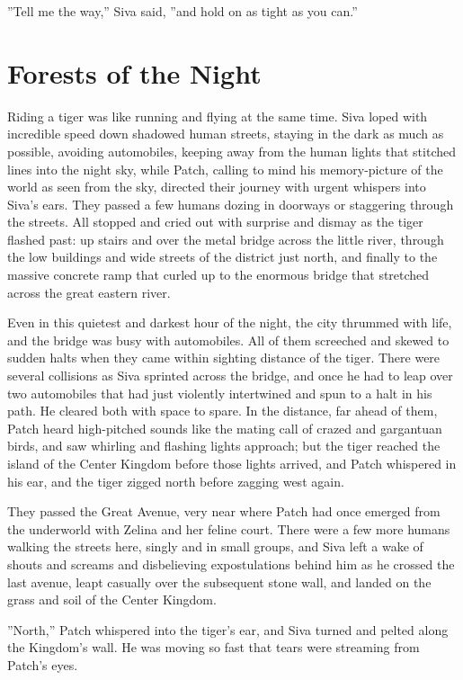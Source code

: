 \documentclass[12pt]{book}
\begin{document}
''Tell me the way,'' Siva said, ''and hold on as tight as you can.''


\section{Forests of the Night}

Riding a tiger was like running and flying at the same time. Siva
loped with incredible speed down shadowed human streets, staying in
the dark as much as possible, avoiding automobiles, keeping away from
the human lights that stitched lines into the night sky, while Patch,
calling to mind his memory-picture of the world as seen from the sky,
directed their journey with urgent whispers into Siva's ears. They
passed a few humans dozing in doorways or staggering through the
streets. All stopped and cried out with surprise and dismay as the
tiger flashed past: up stairs and over the metal bridge across the
little river, through the low buildings and wide streets of the
district just north, and finally to the massive concrete ramp that
curled up to the enormous bridge that stretched across the great
eastern river.

Even in this quietest and darkest hour of the night, the city thrummed
with life, and the bridge was busy with automobiles. All of them
screeched and skewed to sudden halts when they came within sighting
distance of the tiger. There were several collisions as Siva sprinted
across the bridge, and once he had to leap over two automobiles that
had just violently intertwined and spun to a halt in his path. He
cleared both with space to spare. In the distance, far ahead of them,
Patch heard high-pitched sounds like the mating call of crazed and
gargantuan birds, and saw whirling and flashing lights approach; but
the tiger reached the island of the Center Kingdom before those lights
arrived, and Patch whispered in his ear, and the tiger zigged north
before zagging west again.

They passed the Great Avenue, very near where Patch had once emerged
from the underworld with Zelina and her feline court. There were a few
more humans walking the streets here, singly and in small groups, and
Siva left a wake of shouts and screams and disbelieving expostulations
behind him as he crossed the last avenue, leapt casually over the
subsequent stone wall, and landed on the grass and soil of the Center
Kingdom.

''North,'' Patch whispered into the tiger's ear, and Siva turned and
pelted along the Kingdom's wall. He was moving so fast that tears were
streaming from Patch's eyes.
\end{document}
